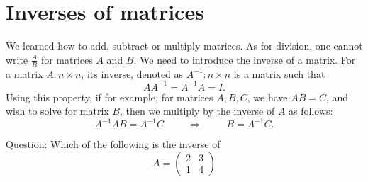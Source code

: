 \documentclass{ximera}
\begin{document}
\section{Inverses of matrices}


We learned how to add, subtract or multiply matrices. As for division, one cannot write $\frac{A}{B}$ for matrices $A$ and $B$. We need to introduce the inverse of a matrix. For a matrix $A: n\times n$, its inverse, denoted as $A^{-1}: n\times n$ is a matrix such that
\begin{equation}\label{inverse}
AA^{-1}= A^{-1}A = I.
\end{equation}
Using this property, if for example, for matrices $A, B, C$, we have $AB = C$, and wish to solve for matrix $B$, then we multiply by the inverse of $A$ as follows:
\begin{equation*}
A^{-1}AB= A^{-1}C \hspace{1cm} \Rightarrow \hspace{1cm} B = A^{-1}C.
\end{equation*}

Question: Which of the following is the inverse of
\begin{equation*}
A= \left(\begin{array}{cc}
  2 & 3   \\
  1 &  4
\end{array}\right)
\end{equation*}
\begin{multipleChoice}





\end{multipleChoice}
\end{document}
